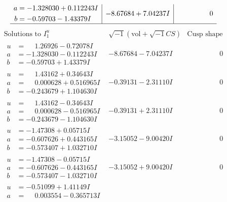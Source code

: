 \documentclass[1p]{elsarticle_modified}
\theoremstyle{definition}
\newcommand{\I}{\sqrt{-1}}
\begin{document}
$$\begin{array}{c|c|c}
\begin{aligned}
a &= -1.328030 + 0.112243 I \\
b &= -0.59703 - 1.43379 I\end{aligned}
 & -8.67684 + 7.04237 I & \phantom{-0.000000 } 0\\
 \hline 
 \end{array}$$\newpage$$\begin{array}{c|c|c}  
\text{Solutions to }I^u_{1}& \I (\text{vol} + \sqrt{-1}CS) & \text{Cusp shape}\\
 \hline 
\begin{aligned}
u &= \phantom{-}1.26926 - 0.72078 I \\
a &= -1.328030 - 0.112243 I \\
b &= -0.59703 + 1.43379 I\end{aligned}
 & -8.67684 - 7.04237 I & \phantom{-0.000000 } 0 \\ \hline\begin{aligned}
u &= \phantom{-}1.43162 + 0.34643 I \\
a &= \phantom{-}0.000628 + 0.516965 I \\
b &= -0.243679 + 1.104630 I\end{aligned}
 & -0.39131 - 2.31110 I & \phantom{-0.000000 } 0 \\ \hline\begin{aligned}
u &= \phantom{-}1.43162 - 0.34643 I \\
a &= \phantom{-}0.000628 - 0.516965 I \\
b &= -0.243679 - 1.104630 I\end{aligned}
 & -0.39131 + 2.31110 I & \phantom{-0.000000 } 0 \\ \hline\begin{aligned}
u &= -1.47308 + 0.05715 I \\
a &= -0.607626 + 0.443165 I \\
b &= -0.573407 + 1.032710 I\end{aligned}
 & -3.15052 - 9.00420 I & \phantom{-0.000000 } 0 \\ \hline\begin{aligned}
u &= -1.47308 - 0.05715 I \\
a &= -0.607626 - 0.443165 I \\
b &= -0.573407 - 1.032710 I\end{aligned}
 & -3.15052 + 9.00420 I & \phantom{-0.000000 } 0 \\ \hline\begin{aligned}
u &= -0.51099 + 1.41149 I \\
a &= \phantom{-}0.003554 - 0.365713 I \\

\end{aligned}
\end{array}$$
\end{document}
